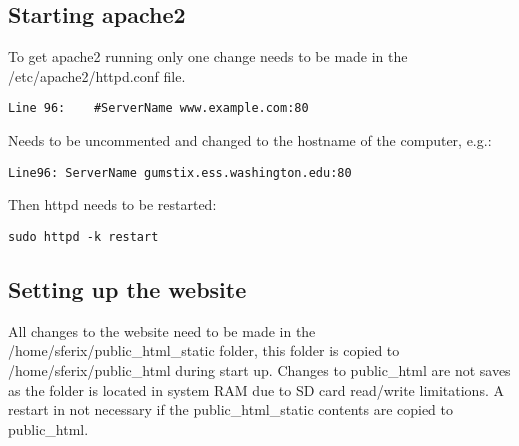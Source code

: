 \documentclass[12pt, letterpaper, onecolumn, oneside]{article}
\begin{document}
\subsection*{Starting apache2}

To get apache2 running only one change needs to be made in the /etc/apache2/httpd.conf file.

\begin{verbatim}
Line 96:	#ServerName www.example.com:80
\end{verbatim}

Needs to be uncommented and changed to the hostname of the computer, e.g.:

\begin{verbatim}
Line96:	ServerName gumstix.ess.washington.edu:80
\end{verbatim}

Then httpd needs to be restarted:

\begin{verbatim}
sudo httpd -k restart
\end{verbatim}

\subsection*{Setting up the website}

All changes to the website need to be made in the /home/sferix/public\_html\_static folder, this folder is copied to /home/sferix/public\_html during start up. Changes to public\_html are not saves as the folder is located in system RAM due to SD card read/write limitations. A restart in not necessary if the public\_html\_static contents are copied to public\_html.






%
%
\end{document}
